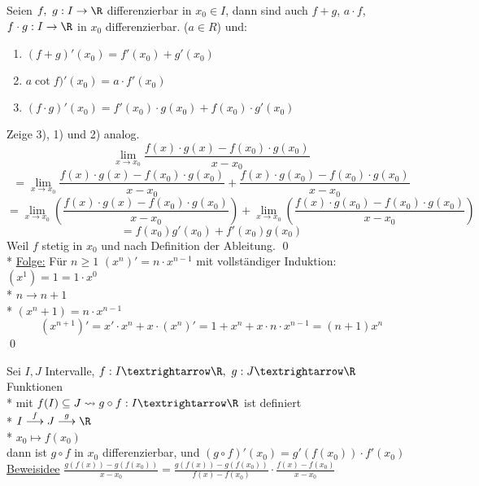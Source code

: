 Seien $f,\ g: I \to \R$ differenzierbar in $x_0 \in I$, dann sind auch $f + g$, $a \cdot f$, $f \cdot g: I \to \R$ in $x_0$ differenzierbar. ($a \in R$) und:
\begin{enumerate}
\item{$(f + g)'(x_0) = f'(x_0) + g'(x_0)$}
\item{$a \cot f)'(x_0) = a \cdot f'(x_0)$}
\item{$(f \cdot g)'(x_0) = f'(x_0) \cdot g(x_0) + f(x_0) \cdot g'(x_0)$}
\end{enumerate}
\bew
Zeige 3), 1) und 2) analog.\\
$$ \lim_{x \to x_0} \frac{f(x) \cdot g(x) - f(x_0) \cdot g(x_0)}{x - x_0}$$
$$= \lim_{x \to x_0} \frac{f(x) \cdot g(x) - f(x_0) \cdot g(x_0)}{x - x_0} + \frac{f(x) \cdot g(x_0) - f(x_0) \cdot g(x_0)}{x - x_0}$$
$$= \lim_{x \to x_0} \left( \frac{f(x) \cdot g(x) - f(x_0) \cdot g(x_0)}{x - x_0} \right) + \lim_{x \to x_0}\left( \frac{f(x) \cdot g(x_0) - f(x_0) \cdot g(x_0)}{x - x_0} \right)$$
$$=f(x_0)g'(x_0) + f'(x_0)g(x_0)$$
Weil $f$ stetig in $x_0$ und nach Definition der Ableitung. \qed{}\\*
\ul{Folge:} Für $n \geq 1$ $(x^n)' = n \cdot x^{n-1}$
\bew
mit vollständiger Induktion:
$(x^1) = 1 =1 \cdot x^0$ \ok\\*
$n \to n + 1$\\*
$(x^n+1) = n\cdot x^{n-1}$
$$(x^{n+1})' = x' \cdot x^n + x \cdot (x^n)' = 1 + x^n + x \cdot n \cdot x^{n-1} = (n+1) x^n$$ \qed

Sei $I,J$ Intervalle, $f:I→\R,\ g:J→\R$ Funktionen\\*
mit $f(I)\subseteq J \leadsto g\circ f:I→\R$ ist definiert\\*
$I\stackrel{f}{\longrightarrow}J\stackrel{g}{\longrightarrow}\R$\\*
$x_0\longmapsto f(x_0)$\\
dann ist $g\circ f$ in $x_0$ differenzierbar,
und $(g\circ f)'(x_0)=g'(f(x_0))·f'(x_0)$\\
\ul{Beweisidee} $\frac{g(f(x)) - g(f(x_0))}{x-x_0} = \frac{g(f(x)) - g(f(x_0))}{f(x)-f(x_0)} \cdot \frac{f(x) - f(x_0)}{x-x_0}$